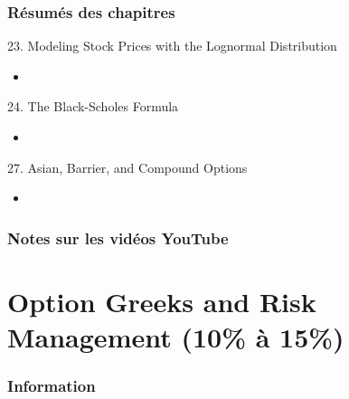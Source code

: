 \documentclass[12pt, titlepage, french]{report}
\begin{document}
\subsection{Résumés des chapitres}

\begin{CHPT_SUMM_AUTO}[label = {L.-23}]{23. Modeling Stock Prices with the Lognormal Distribution}
	\begin{itemize}
		\item	
	\end{itemize}
\end{CHPT_SUMM_AUTO}

\begin{CHPT_SUMM_AUTO}[label = {L.-24}]{24. The Black-Scholes Formula}
	\begin{itemize}
		\item	
	\end{itemize}
\end{CHPT_SUMM_AUTO}

\begin{CHPT_SUMM_AUTO}[label = {L.-27}]{{27. Asian, Barrier, and Compound Options}}
	\begin{itemize}
		\item	
	\end{itemize}
\end{CHPT_SUMM_AUTO}

\subsection{Notes sur les vidéos YouTube}


\newpage

\chapter[Option Greeks and Risk Management]{Option Greeks and Risk Management (10\% à 15\%)}

\subsection{Information}

\begin{distributions}[Objective]

\end{distributions}
\end{document}
